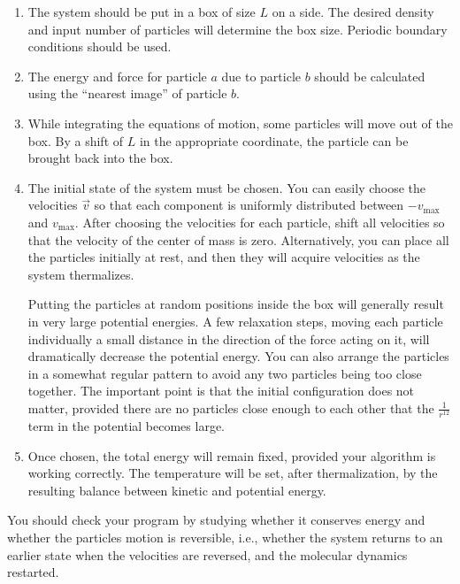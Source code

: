\begin{enumerate}
    \item The system should be put in a box of size $L$ on a side. The desired density and
          input number of particles will determine the box size. Periodic boundary
          conditions should be used.
    \item The energy and force for particle $a$ due to particle $b$ should be calculated
          using the ``nearest image'' of particle $b$.
    \item While integrating the equations of motion, some particles will move out of the
          box. By a shift of $L$ in the appropriate coordinate, the particle can be brought
          back into the box.
    \item The initial state of the system must be chosen. You can easily choose the
          velocities $\vec{v}$ so that each component is uniformly distributed between
          $-v_\text{max}$ and $v_\text{max}$. After choosing the velocities for each
          particle, shift all velocities so that the velocity of the center of mass is zero.
          Alternatively, you can place all the particles initially at rest, and then they
          will acquire velocities as the system thermalizes.

          Putting the particles at random positions inside the box will generally result in
          very large potential energies. A few relaxation steps, moving each particle
          individually a small distance in the direction of the force acting on it, will
          dramatically decrease the potential energy. You can also arrange the particles in
          a somewhat regular pattern to avoid any two particles being too close together.
          The important point is that the initial configuration does not matter, provided
          there are no particles close enough to each other that the $\frac{ 1 }{ r^{12} }$
          term in the potential becomes large.
    \item Once chosen, the total energy will remain fixed, provided your algorithm is
          working correctly. The temperature will be set, after thermalization, by the
          resulting balance between kinetic and potential energy.
\end{enumerate}

You should check your program by studying whether it conserves energy and whether the
particles motion is reversible, i.e., whether the system returns to an earlier state when
the velocities are reversed, and the molecular dynamics restarted.

